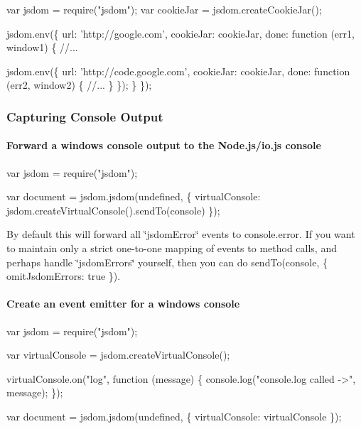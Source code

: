 \begin{DoxyCode}
var jsdom = require("jsdom");
var cookieJar = jsdom.createCookieJar();

jsdom.env(\{
    url: 'http://google.com',
    cookieJar: cookieJar,
    done: function (err1, window1) \{
        //...

        jsdom.env(\{
            url: 'http://code.google.com',
            cookieJar: cookieJar,
            done: function (err2, window2) \{
                //...
            \}
        \});
    \}
\});
\end{DoxyCode}


\subsubsection*{Capturing Console Output}

\paragraph*{Forward a window\textquotesingle{}s console output to the Node.\+js/io.js console}


\begin{DoxyCode}
var jsdom = require("jsdom");

var document = jsdom.jsdom(undefined, \{
  virtualConsole: jsdom.createVirtualConsole().sendTo(console)
\});
\end{DoxyCode}


By default this will forward all {\ttfamily \char`\"{}jsdom\+Error\char`\"{}} events to {\ttfamily console.\+error}. If you want to maintain only a strict one-\/to-\/one mapping of events to method calls, and perhaps handle {\ttfamily \char`\"{}jsdom\+Errors\char`\"{}} yourself, then you can do {\ttfamily send\+To(console, \{ omit\+Jsdom\+Errors\+: true \})}.

\paragraph*{Create an event emitter for a window\textquotesingle{}s console}


\begin{DoxyCode}
var jsdom = require("jsdom");

var virtualConsole = jsdom.createVirtualConsole();

virtualConsole.on("log", function (message) \{
  console.log("console.log called ->", message);
\});

var document = jsdom.jsdom(undefined, \{
  virtualConsole: virtualConsole
\});
\end{DoxyCode}



